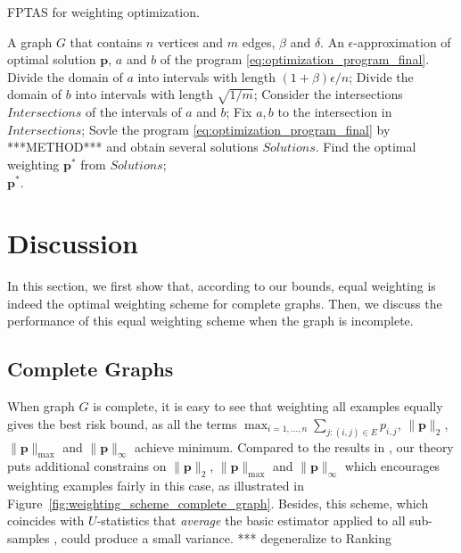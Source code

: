 \documentclass[letterpaper]{article} %
\newcommand{\probdistri}{\mathbf{p}}
\newcommand{\pair}[1]{(#1)}
\newcommand{\citep}[3]{(#1\ \citeauthor{#3}\ \citeyear{#3},\ #2)}
\begin{document}
\begin{algorithm}[htb] 
\caption{FPTAS for weighting optimization.} 
\label{alg:FPTAS} 
\begin{algorithmic}[1]
\Require 
A graph $G$ that contains $n$ vertices and $m$ edges, $\beta$ and $\delta$.
\Ensure 
An $\epsilon$-approximation of optimal solution $\probdistri{}$, $a$ and $b$ of the program \eqref{eq:optimization_program_final}.
\State Divide the domain of $a$ into intervals with length $(1+\beta)\epsilon/n$;
\State Divide the domain of $b$ into intervals with length $\sqrt{1/m}$;
\State Consider the intersections $Intersections$ of the intervals of $a$ and $b$;
\State Fix $a, b$ to the intersection in $Intersections$;
\State Sovle the program \eqref{eq:optimization_program_final} by ***METHOD*** and obtain several solutions $Solutions$.
\State Find the optimal weighting $\probdistri{}^*$ from $Solutions$;\\
\Return $\probdistri{}^*$.
\end{algorithmic} 
\end{algorithm}




\section{Discussion} %
\label{sec:discussion}

In this section, we first show that, according to our bounds, equal weighting is indeed the optimal weighting scheme for complete graphs. 
Then, we discuss the performance of this equal weighting scheme when the graph is incomplete. %

\subsection{Complete Graphs} %
\label{sub:complete_graph}

When graph $G$ is complete, it is easy to see that weighting all examples equally gives the best risk bound, as all the terms $\max_{i=1,\dots,n} \sum_{j:\pair{i,j}\in E} p_{i,j}$, $\|\probdistri{}\|_2$, $\|\probdistri{}\|_\max$ and $\|\probdistri{}\|_\infty$ achieve minimum. 
Compared to the results in \cite{wang2017learning}, our theory puts additional constrains on $\|\probdistri{}\|_2$, $\|\probdistri{}\|_\max$ and $\|\probdistri{}\|_\infty$ which encourages weighting examples fairly in this case, as illustrated in Figure~\ref{fig:weighting_scheme_complete_graph}. 
Besides, this scheme, which coincides with $U$-statistics that \emph{average} the basic estimator applied to all sub-samples \cite{hoeffding1948class}, could produce a small variance. 
*** degeneralize to Ranking
\end{document}
